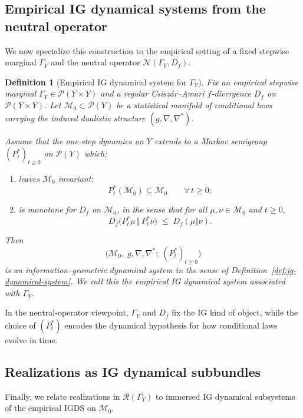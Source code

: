 \documentclass[11pt]{article}
\newtheorem{definition}{Definition}
\newcommand{\Pcal}{\mathcal{P}}
\newcommand{\Mcal}{\mathcal{M}}
\newcommand{\Ncal}{\mathcal{N}}
\begin{document}
\subsection{Empirical IG dynamical systems from the neutral operator}

We now specialize this construction to the empirical setting of a fixed
stepwise marginal $\Gamma_Y$ and the neutral operator
$\Ncal(\Gamma_Y,D_f)$.

\begin{definition}[Empirical IG dynamical system for $\Gamma_Y$]
\label{def:empirical-igds}
Fix an empirical stepwise marginal $\Gamma_Y \in \Pcal(Y\times Y)$ and a
regular Csiszár--Amari $f$-divergence $D_f$ on $\Pcal(Y\times Y)$. Let
$\Mcal_0 \subset \Pcal(Y)$ be a statistical manifold of conditional laws
carrying the induced dualistic structure $(g,\nabla,\nabla^\ast)$.

Assume that the one-step dynamics on $Y$ extends to a Markov semigroup
$(P_t^\ast)_{t\ge 0}$ on $\Pcal(Y)$ which:
\begin{enumerate}[label=(EIG\arabic*),leftmargin=1.8em]
  \item leaves $\Mcal_0$ invariant:
  \[
    P_t^\ast(\Mcal_0) \subseteq \Mcal_0
    \qquad \forall\,t\ge 0;
  \]
  \item is monotone for $D_f$ on $\Mcal_0$, in the sense that for all
  $\mu,\nu\in\Mcal_0$ and $t\ge 0$,
  \[
    D_f\bigl(P_t^\ast\mu \,\Vert\, P_t^\ast\nu\bigr)
    \;\le\; D_f(\mu\Vert\nu).
  \]
\end{enumerate}
Then
\[
  \bigl(\Mcal_0,\; g,\nabla,\nabla^\ast;\; (P_t^\ast)_{t\ge 0}\bigr)
\]
is an information--geometric dynamical system in the sense of
Definition~\ref{def:ig-dynamical-system}. We call this the
\emph{empirical IG dynamical system associated with $\Gamma_Y$}.
\end{definition}

In the neutral-operator viewpoint, $\Gamma_Y$ and $D_f$ fix the IG
kind of object, while the choice of $(P_t^\ast)$ encodes the dynamical hypothesis
for how conditional laws evolve in time.

\subsection{Realizations as IG dynamical subbundles}

Finally, we relate realizations in $\mathcal{R}(\Gamma_Y)$ to immersed IG
dynamical subsystems of the empirical IGDS on $\Mcal_0$.
\end{document}
